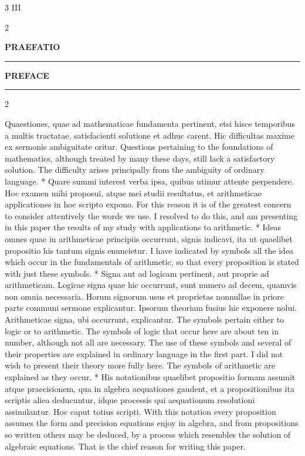 \documentclass{book}
\newcommand{\s}{\switchcolumn} %
\newcommand\peanoHeadingLarge[1]{ \vspace{2cm} {\Large \textbf{\uppercase{#1}} \nopagebreak[4]}

  \noindent\rule{2cm}{0.4pt} \nopagebreak[1]}
\newcommand{\peanoPage}[1]{\vspace{1ex}

  \columnratio{0.475, 0.05, 0.475} \begin{paracol}{3} \centering \hdashrule{\columnwidth}{0.1mm}{0.1mm 1mm} \s #1 \s \hdashrule{\columnwidth}{0.1mm}{0.1mm 1mm} \end{paracol}

\vspace{1ex}}
\newenvironment{translateTwoCol}
               { %
                 \columnratio{0.5, 0.5} \begin{paracol}{2}
                 \newcommand{\LAT}{\switchcolumn[0]*}
                 \newcommand{\ENG}{\switchcolumn[1]}
               }
               { %
                 \let\ENG\undefined
                 \let\LAT\undefined
                 \end{paracol}
               }
\begin{document}
\vspace{1em}
\peanoPage{III} %

\begin{translateTwoCol}
\centering
{}
{}
\peanoHeadingLarge{Praefatio}
\ENG
\peanoHeadingLarge{Preface}
\end{translateTwoCol}

\begin{translateTwoCol}
Quaestiones, quae ad mathematicae fundamenta pertinent, etsi hisce temporibus a multis tractatae, satisfacienti solutione et adhuc carent. Hic difficultas maxime ex sermonis ambiguitate oritur.
\ENG Questions pertaining to the foundations of mathematics, although treated by many these days, still lack a satisfactory solution. The difficulty arises principally from the ambiguity of ordinary language.
\LAT
Quare summi interest verba ipsa, quibus utimur attente perpendere. Hoc examen mihi proposui, atque mei studii resultatus, et arithmeticae applicationes in hoc scripto expono.
\ENG For this reason it is of the greatest concern to consider attentively the words we use. I resolved to do this, and am presenting in this paper the results of my study with applications to arithmetic.
\LAT
Ideas omnes quae in arithmeticae principiis occurrunt, signis indicavi, ita ut quaelibet propositio his tantum signis enuncietur.
\ENG I have indicated by symbols all the idea which occur in the fundamentals of arithmetic, so that every proposition is stated with just these symbols.
\LAT
Signa aut ad logicam pertinent, aut proprie ad arithmeticam. Logicae signa quae hic occurrunt, sunt numero ad decem, quamvis non omnia necessaria. Horum signorum usus et proprietas nonnullae in priore parte communi sermone explicantur. Ipsorum theoriam fusius hic exponere nolui. Arithmeticae signa, ubi occurrunt, explicantur.
\ENG The symbols pertain either to logic or to arithmetic. The symbols of logic that occur here are about ten in number, although not all are necessary. The use of these symbols and several of their properties are explained in ordinary language in the first part. I did not wish to present their theory more fully here. The symbols of arithmetic are explained as they occur.
\LAT
His notationibus quaelibet propositio formam assumit atque praecisionem, qua in algebra aequationes gaudent, et a propositionibus ita scriptis aliea deducuntur, idque processis qui aequationum resolutioni assimilantur. Hoc caput totius scripti.
\ENG With this notation every proposition assumes the form and precision equations enjoy in algebra, and from propositions so written others may be deduced, by a process which resembles the solution of algebraic equations. That is the chief reason for writing this paper.

\end{translateTwoCol}
\end{document}
